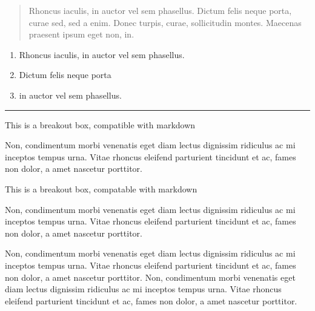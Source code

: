 \documentclass[
  oneside,
  12pt]{crumpbook}
\providecommand{\tightlist}{%
  \setlength{\itemsep}{0pt}\setlength{\parskip}{0pt}}
\begin{document}
\begin{quote}
Rhoncus iaculis, in auctor vel sem phasellus. Dictum felis neque porta, curae sed, sed a enim. Donec turpis, curae, sollicitudin montes. Maecenas praesent ipsum eget non, in.
\end{quote}

\begin{enumerate}
\def\labelenumi{\arabic{enumi}.}
\tightlist
\item
  Rhoncus iaculis, in auctor vel sem phasellus.
\item
  Dictum felis neque porta
\item
  in auctor vel sem phasellus.
\end{enumerate}

\begin{center}\rule{0.5\linewidth}{0.5pt}\end{center}

This is a breakout box, compatible with markdown

Non, condimentum morbi venenatis eget diam lectus dignissim ridiculus ac mi inceptos tempus urna. Vitae rhoncus eleifend parturient tincidunt et ac, fames non dolor, a amet nascetur porttitor.

This is a breakout box, compatable with markdown

Non, condimentum morbi venenatis eget diam lectus dignissim ridiculus ac mi inceptos tempus urna. Vitae rhoncus eleifend parturient tincidunt et ac, fames non dolor, a amet nascetur porttitor.

Non, condimentum morbi venenatis eget diam lectus dignissim ridiculus ac mi inceptos tempus urna. Vitae rhoncus eleifend parturient tincidunt et ac, fames non dolor, a amet nascetur porttitor. Non, condimentum morbi venenatis eget diam lectus dignissim ridiculus ac mi inceptos tempus urna. Vitae rhoncus eleifend parturient tincidunt et ac, fames non dolor, a amet nascetur porttitor.
\end{document}

